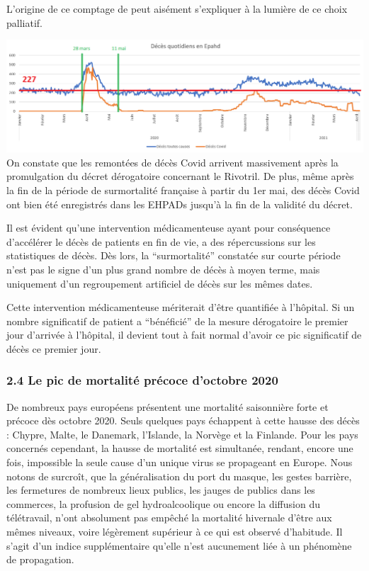 \documentclass[
]{article}
\begin{document}
L'origine de ce comptage de peut aisément s'expliquer à la lumière de ce
choix palliatif.

\includegraphics[width=10.41667in,height=\textheight]{data/images/EHPAD.png}
On constate que les remontées de décès Covid arrivent massivement après
la promulgation du décret dérogatoire concernant le Rivotril. De plus,
même après la fin de la période de surmortalité française à partir du
1er mai, des décès Covid ont bien été enregistrés dans les EHPADs
jusqu'à la fin de la validité du décret.

Il est évident qu'une intervention médicamenteuse ayant pour conséquence
d'accélérer le décès de patients en fin de vie, a des répercussions sur
les statistiques de décès. Dès lors, la ``surmortalité'' constatée sur
courte période n'est pas le signe d'un plus grand nombre de décès à
moyen terme, mais uniquement d'un regroupement artificiel de décès sur
les mêmes dates.

Cette intervention médicamenteuse mériterait d'être quantifiée à
l'hôpital. Si un nombre significatif de patient a ``bénéficié'' de la
mesure dérogatoire le premier jour d'arrivée à l'hôpital, il devient
tout à fait normal d'avoir ce pic significatif de décès ce premier jour.

\hypertarget{le-pic-de-mortalituxe9-pruxe9coce-doctobre-2020}{%
\subsubsection{2.4 Le pic de mortalité précoce d'octobre
2020}\label{le-pic-de-mortalituxe9-pruxe9coce-doctobre-2020}}

De nombreux pays européens présentent une mortalité saisonnière forte et
précoce dès octobre 2020. Seuls quelques pays échappent à cette hausse
des décès : Chypre, Malte, le Danemark, l'Islande, la Norvège et la
Finlande. Pour les pays concernés cependant, la hausse de mortalité est
simultanée, rendant, encore une fois, impossible la seule cause d'un
unique virus se propageant en Europe. Nous notons de surcroît, que la
généralisation du port du masque, les gestes barrière, les fermetures de
nombreux lieux publics, les jauges de publics dans les commerces, la
profusion de gel hydroalcoolique ou encore la diffusion du télétravail,
n'ont absolument pas empêché la mortalité hivernale d'être aux mêmes
niveaux, voire légèrement supérieur à ce qui est observé d'habitude. Il
s'agit d'un indice supplémentaire qu'elle n'est aucunement liée à un
phénomène de propagation.
\end{document}
